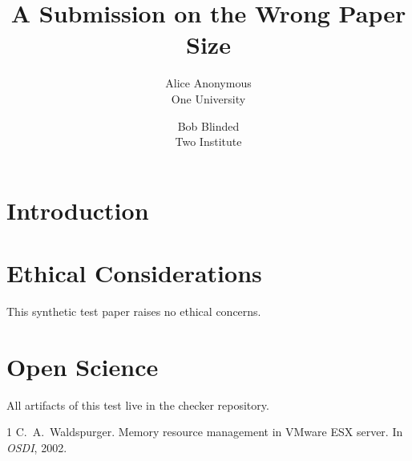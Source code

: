 \documentclass[a4paper,twocolumn,10pt]{article}
\date{}
\title{\Large \bf A Submission on the Wrong Paper Size}
\author{{\rm Alice Anonymous}\\One University \and {\rm Bob Blinded}\\Two Institute}
\begin{document}
\maketitle

\begin{abstract}
\lipsum[1][1-5]
\end{abstract}

\section{Introduction}
\lipsum[2-4]

\appendix
\section*{Ethical Considerations}
This synthetic test paper raises no ethical concerns.

\section*{Open Science}
All artifacts of this test live in the checker repository.

\begin{thebibliography}{1}
 C.~A.\ Waldspurger. Memory resource management in VMware ESX
  server. In \emph{OSDI}, 2002.
\end{thebibliography}
\end{document}
